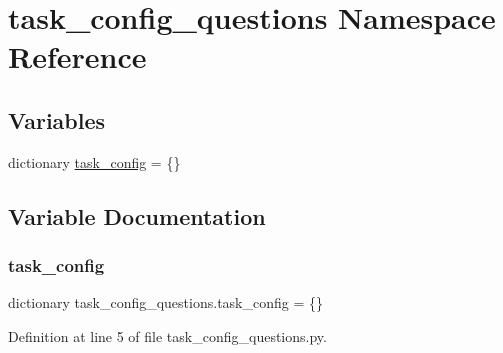 \hypertarget{namespacetask__config__questions}{}\section{task\+\_\+config\+\_\+questions Namespace Reference}
\label{namespacetask__config__questions}
\subsection*{Variables}
\begin{DoxyCompactItemize}
\item 
dictionary \hyperlink{namespacetask__config__questions_a78b94b014ed2af622dde8ede44aed776}{task\+\_\+config} = \{\}
\end{DoxyCompactItemize}


\subsection{Variable Documentation}
\mbox{\label{namespacetask__config__questions_a78b94b014ed2af622dde8ede44aed776}} 
\subsubsection{\texorpdfstring{task\+\_\+config}{task\_config}}
{\footnotesize\ttfamily dictionary task\+\_\+config\+\_\+questions.\+task\+\_\+config = \{\}}



Definition at line 5 of file task\+\_\+config\+\_\+questions.\+py.

